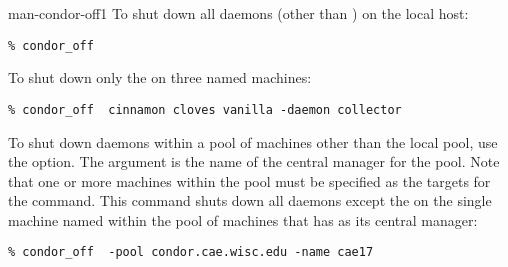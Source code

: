 \begin{ManPage}{}{man-condor-off}{1}
\Examples
To shut down all daemons (other than ) on the
local host:
\begin{verbatim}
% condor_off
\end{verbatim}

To shut down only the  on three named machines:
\begin{verbatim}
% condor_off  cinnamon cloves vanilla -daemon collector
\end{verbatim}

To shut down daemons within a pool of machines other than the
local pool, use the  option.
The argument is the name of the central manager for the pool.
Note that one or more machines within the pool must be
specified as the targets for the command.
This command shuts down all daemons except the 
on the single machine named  within the
pool of machines that has  as
its central manager:
\begin{verbatim}
% condor_off  -pool condor.cae.wisc.edu -name cae17
\end{verbatim}

\end{ManPage}
